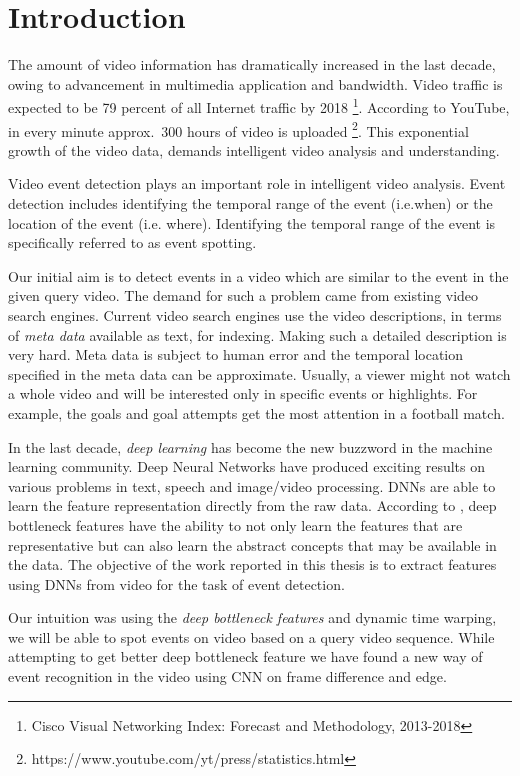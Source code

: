 \chapter{Introduction}
\label{chap:intro}

The amount of video information has dramatically increased in the last decade, owing to advancement in multimedia application and bandwidth.  Video traffic is expected to be  79 percent of all Internet traffic by 2018 \footnote{Cisco Visual Networking Index: Forecast and Methodology, 2013-2018}.  According to YouTube, in every minute approx.~300 hours of video is uploaded \footnote{https://www.youtube.com/yt/press/statistics.html}.  This exponential growth of the video data, demands intelligent video analysis and understanding.

Video event detection plays an important role in intelligent video analysis.  Event detection includes identifying the temporal range of the event (i.e.when) or the location of the event (i.e.  where).  Identifying the temporal range of the event is specifically referred to as event spotting. 

Our initial aim is to detect events in a video which are similar to the event in the given query video.  The demand for such a problem came from existing video search engines.  Current video search engines use the video descriptions, in terms of  \textit{meta data} available as text, for indexing.  Making such a detailed description is very hard.  Meta data is subject to human error and the temporal location specified in the meta data can be approximate.  Usually, a viewer might not watch a whole video and will be interested only in specific events or highlights.  For example, the goals and goal attempts get the most attention in a football match.

In the last decade, \textit{deep learning} has become the new buzzword in the machine learning community.  Deep Neural Networks have produced exciting results on various problems in text, speech and image/video processing.  DNNs are able to learn the feature representation directly from the raw data.  According to \citet{hinton2009deep}, deep bottleneck features have the ability to not only learn the features that are representative but can also learn the abstract concepts that may be available in the data.   The objective of the work reported in this thesis is to extract features using DNNs from video for the task of event detection.

Our intuition was using the \textit{deep bottleneck features} and dynamic time warping, we will be able to spot events on video based on a query video sequence.  While attempting  to get better deep bottleneck feature we have found a new  way of event recognition in the video using CNN on frame difference and edge.

